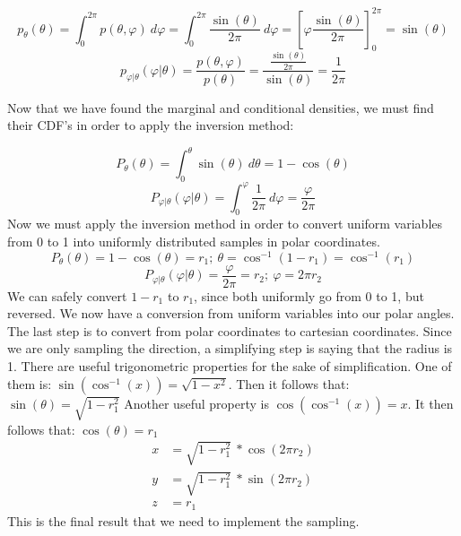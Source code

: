\[
p_{\theta}(\theta)=\int^{2\pi}_{0}p(\theta, \varphi)\ d\varphi = \int^{2\pi}_{0}\frac{\sin(\theta)}{2\pi}\ d\varphi=\left[\varphi\frac{\sin(\theta)}{2\pi} \right]^{2\pi}_{0} = \sin(\theta)
\]
\[
p_{\varphi\vert\theta}(\varphi\vert\theta)=\frac{p(\theta,\varphi)}{p(\theta)}=\frac{\frac{\sin(\theta)}{2\pi}}{\sin(\theta)}=\frac{1}{2\pi}
\]

Now that we have found the marginal and conditional densities, we must find their CDF's in order to apply the inversion method:

\[
P_{\theta}(\theta)=\int_{0}^{\theta} \sin(\theta)\ d\theta= 1-\cos(\theta)
\]
\[
P_{\varphi\vert\theta}(\varphi\vert\theta) = \int^{\varphi}_{0}\frac{1}{2\pi}\ d\varphi = \frac{\varphi}{2\pi}
\]
Now we must apply the inversion method in order to convert uniform variables from 0 to 1 into uniformly distributed samples in polar coordinates.
\[
P_{\theta}(\theta)=1-\cos(\theta)=r_{1};\ \theta=\cos^{-1}(1-r_{1})=\cos^{-1}(r_{1})
\]
\[
P_{\varphi\vert\theta}(\varphi\vert\theta)=\frac{\varphi}{2\pi}=r_{2};\ \varphi =2\pi r_{2}
\]
We can safely convert $1-r_{1}$ to $r_{1}$, since both uniformly go from 0 to 1, but reversed.
We now have a conversion from uniform variables into our polar angles. The last step is to convert from polar coordinates to cartesian coordinates. Since we are only sampling the direction, a simplifying step is saying that the radius is 1.
There are useful trigonometric properties for the sake of simplification. One of them is: $\sin(\cos^{-1}(x))=\sqrt{1-x^{2}}$. Then it follows that: $\sin(\theta)=\sqrt{1-r_{1}^{2}}$
Another useful property is $\cos(\cos^{-1}(x))=x. $ It then follows that: $\cos(\theta)=r_{1}$
\begin{align*} 
x&=\sqrt{1-r_{1}^{2}}\ *\cos(2\pi r_{2}) \\
y&=\sqrt{1-r_{1}^{2}}\ *\sin(2\pi r_{2}) \\
z&=r_{1}
\end{align*}
This is the final result that we need to implement the sampling.


